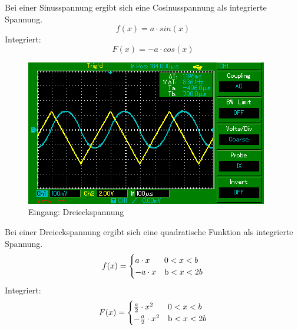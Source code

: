 Bei einer Sinusspannung ergibt sich eine Cosinusspannung als integrierte Spannung.
\begin{equation*}
  f(x) = a \cdot sin(x)
\end{equation*}
Integriert:
\begin{equation*}
  F(x) = -a \cdot cos(x)
\end{equation*}

\begin{figure}[H]
  \centering
  \includegraphics{MAP003.png}
  \caption{Eingang: Dreieckspannung}
  \label{fig:Dreieckspannung}
\end{figure}

Bei einer Dreieckspannung ergibt sich eine quadratische Funktion als integrierte Spannung.
\begin{equation*}
  f(x) =
  \begin{cases}
    a \cdot x & \text 0 < x < b \\
    -a \cdot x & \text b < x < 2b \\
  \end{cases}
\end{equation*}
Integriert:
\begin{equation*}
  F(x) =
  \begin{cases}
    \frac{a}{2} \cdot x^2 & \text 0 < x < b \\
    -\frac{a}{2} \cdot x^2 & \text b < x < 2b \\
  \end{cases}
\end{equation*}
